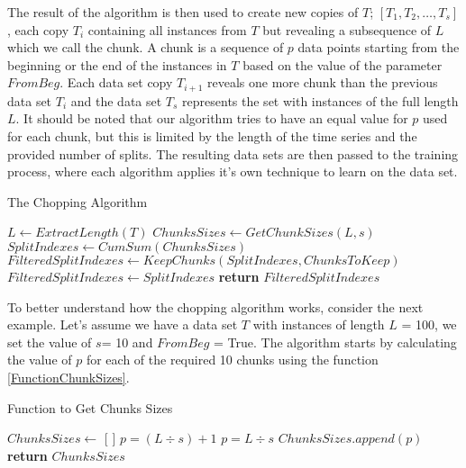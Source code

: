 The result of the algorithm is then used to create new copies of $T$; $[T_{1}, T_{2}, \ldots, T_{s}]$, each copy $T_{i}$ containing all instances from $T$ but revealing a subsequence of $L$
which we call the chunk. A chunk is a sequence of $p$ data points starting from the beginning or the end of the instances in $T$ based on the value of the parameter $FromBeg$.
Each data set copy $T_{i+1}$ reveals one more chunk than the previous data set $T_{i}$ and the data set $T_{s}$ represents the set with instances of the full length $L$.
It should be noted that our algorithm tries to have an equal value for $p$ used for each chunk, but this is limited by the length of the time series and the provided number of splits.
The resulting data sets are then passed to the training process, where each algorithm applies it's own technique to learn on the data set.

\begin{algorithm}
    \caption{The Chopping Algorithm}\label{AlgorithmChopping}
    \begin{algorithmic}[1]
        \State $L \gets ExtractLength(T)$
        \State $ChunksSizes \gets GetChunkSizes(L,s)$
        \State $SplitIndexes \gets CumSum(ChunksSizes)$
                \State $FilteredSplitIndexes \gets KeepChunks(SplitIndexes,ChunksToKeep)$
            \Else
                \State $FilteredSplitIndexes \gets SplitIndexes$
            \EndIf
        \State \textbf{return} $FilteredSplitIndexes$
      \EndFunction
    \end{algorithmic}
\end{algorithm}

To better understand how the chopping algorithm works, consider the next example.
Let's assume we have a data set $T$ with instances of length $L$ = 100, we set the value of $s$= 10 and $FromBeg$ = True.
The algorithm starts by calculating the value of $p$ for each of the required 10 chunks using the function \ref{FunctionChunkSizes}.

\begin{algorithm}
    \caption{Function to Get Chunks Sizes}\label{FunctionChunkSizes}
    \begin{algorithmic}[1]
      \State $ChunksSizes \gets$ [ ]
                \State $p = (L \div{s}) + 1$
            \Else
                \State $p = L \div{s}$
            \EndIf
            \State $ChunksSizes.append(p)$
        \EndFor
        \State \textbf{return} $ChunksSizes$
      \EndFunction
    \end{algorithmic}
\end{algorithm}

